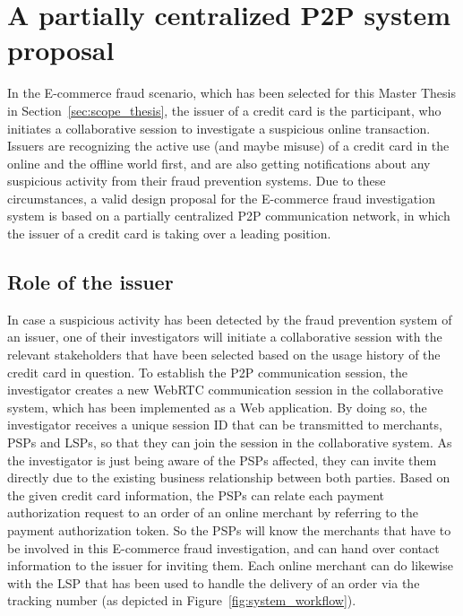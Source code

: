 
\section{A partially centralized \gls{P2P} system proposal}
\label{sec:p2p_partially_centralized_system}

In the \gls{E-commerce} fraud scenario, which has been selected for this Master Thesis in Section~\ref{sec:scope_thesis}, the issuer of a credit card is the participant, who initiates a collaborative session to investigate a suspicious online transaction. Issuers are recognizing the active use (and maybe misuse) of a credit card in the online and the offline world first, and are also getting notifications about any suspicious activity from their fraud prevention systems. Due to these circumstances, a valid design proposal for the \gls{E-commerce} fraud investigation system is based on a partially centralized \gls{P2P} communication network, in which the issuer of a credit card is taking over a leading position.

\subsection{Role of the issuer}
\label{subsec:p2p_partially_issuer_collecting}

In case a suspicious activity has been detected by the fraud prevention system of an issuer, one of their investigators will initiate a collaborative session with the relevant stakeholders that have been selected based on the usage history of the credit card in question. To establish the \gls{P2P} communication session, the investigator creates a new \gls{WebRTC} communication session in the collaborative system, which has been implemented as a Web application. By doing so, the investigator receives a unique session ID that can be transmitted to merchants, \gls{PSP}s and \gls{LSP}s, so that they can join the session in the collaborative system. As the investigator is just being aware of the \gls{PSP}s affected, they can invite them directly due to the existing business relationship between both parties. Based on the given credit card information, the \gls{PSP}s can relate each payment authorization request to an order of an online merchant by referring to the payment authorization token. So the \gls{PSP}s will know the merchants that have to be involved in this \gls{E-commerce} fraud investigation, and can hand over contact information to the issuer for inviting them. Each online merchant can do likewise with the \gls{LSP} that has been used to handle the delivery of an order via the tracking number (as depicted in Figure~\ref{fig:system_workflow}). \\

